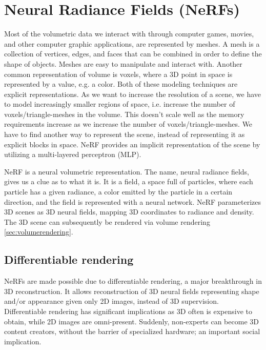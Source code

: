 \section{Neural Radiance Fields (NeRFs)}
Most of the volumetric data we interact with through computer games, movies, and other computer graphic applications, are represented by meshes. A mesh is a collection of vertices, edges, and faces that can be combined in order to define the shape of objects. Meshes are easy to manipulate and interact with. Another common representation of volume is voxels, where a 3D point in space is represented by a value, e.g. a color. Both of these modeling techniques are explicit representations. As we want to increase the resolution of a scene, we have to model increasingly smaller regions of space, i.e. increase the number of voxels/triangle-meshes in the volume. This doesn't scale well as the memory requirements increase as we increase the number of voxels/triangle-meshes. We have to find another way to represent the scene, instead of representing it as explicit blocks in space. NeRF provides an implicit representation of the scene by utilizing a multi-layered perceptron (MLP).

NeRF is a neural volumetric representation. The name, neural radiance fields, gives us a clue as to what it is. It is a field, a space full of particles, where each particle has a given radiance, a color emitted by the particle in a certain direction, and the field is represented with a neural network. NeRF parameterizes 3D scenes as 3D neural fields, mapping 3D coordinates to radiance and density. The 3D scene can subsequently be rendered via volume rendering \autoref{sec:volumerendering}.

\subsection{Differentiable rendering} %
NeRFs are made possible due to differentiable rendering, a major breakthrough in 3D reconstruction. It allows reconstruction of 3D neural fields representing shape and/or appearance given only 2D images, instead of 3D supervision. Differentiable rendering has significant implications as 3D often is expensive to obtain, while 2D images are omni-present. Suddenly, non-experts can become 3D content creators, without the barrier of specialized hardware; an important social implication\cite{xieNeuralFieldsVisual2022}.




